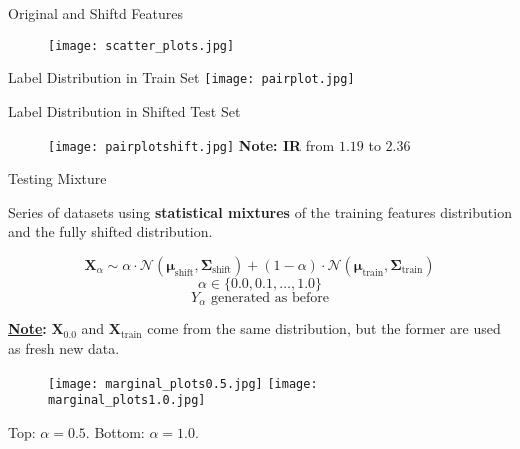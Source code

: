 \begin{frame}{Original and Shiftd Features}
    \begin{figure}
        \centering
        \texttt{[image: scatter\_plots.jpg]}
    \end{figure}
\end{frame}

\begin{frame}{Label Distribution in Train Set} 
    \vfill
    \centering
    \texttt{[image: pairplot.jpg]}
    \vfill

\end{frame}

\begin{frame}{Label Distribution in Shifted Test Set}
    \begin{figure}
        \centering
        \vfill
        \texttt{[image: pairplotshift.jpg]}
        \vfill
        \textbf{Note: IR} from $1.19$ to $2.36$ 
        \vfill
    
    \end{figure}
\end{frame}

\begin{frame}{Testing Mixture}
    
    Series of datasets using \textbf{statistical mixtures} of the training features distribution and the fully shifted distribution.

    $$
    \boldsymbol{X}_\alpha \sim \alpha\cdot\mathcal{N}(\boldsymbol{\mu}_{\text{shift}}, \boldsymbol{\Sigma}_{\text{shift}}) + (1-\alpha)\cdot\mathcal{N}(\boldsymbol{\mu}_{\text{train}}, \boldsymbol{\Sigma}_{\text{train}})
    $$
    $$
    \alpha \in \{0.0, 0.1, \dots, 1.0\}
    $$
    $$
    Y_\alpha \text{ generated as before}
    $$

    \textbf{\underline{Note}:} $\boldsymbol{X}_{0.0}$ and $\boldsymbol{X}_{\text{train}}$ come from the same distribution, but the former are used as fresh new data.

\end{frame}

\begin{frame}
    \vfill
    \begin{figure}
        \centering
        \texttt{[image: marginal\_plots0.5.jpg]}
        \texttt{[image: marginal\_plots1.0.jpg]}
    \end{figure}
    Top: $\alpha=0.5$. Bottom: $\alpha=1.0$.
\end{frame}

